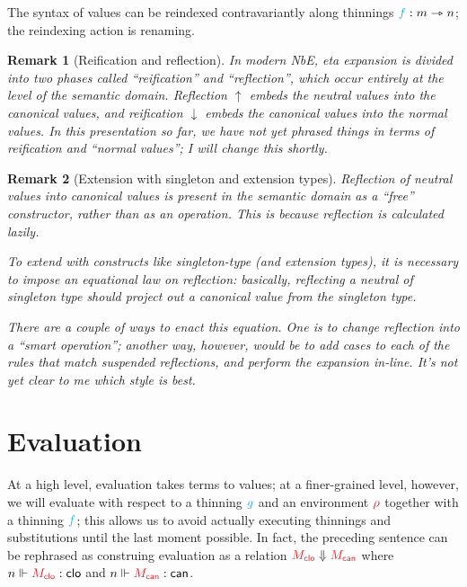 \documentclass{article}
\newtheorem{remark}{Remark}
\newcommand\FmtThin[1]{{\color{ProcessBlue}#1}}
\newcommand\Thin[2]{{#1}\rightarrowtriangle{#2}}
\newcommand\IsThin[3]{\FmtThin{#1}:\Thin{#2}{#3}}
\newcommand\FmtVal[1]{{\color{Red}{#1}}}
\newcommand\EvalClo[2]{\FmtVal{#1}\Downarrow\FmtVal{#2}}
\begin{document}
The syntax of values can be reindexed contravariantly along
thinnings $\IsThin{f}{m}{n}$; the
reindexing action is renaming.

\begin{remark}[Reification and reflection]

  In modern NbE, eta expansion is divided into two phases called
  ``reification'' and ``reflection'', which occur entirely at the level of the
  semantic domain. Reflection $\uparrow$ embeds the neutral values into the
  canonical values, and reification $\downarrow$ embeds the canonical values
  into the normal values.
%
  In this presentation so far, we have not yet phrased things in terms of
  reification and ``normal values''; I will change this shortly.

\end{remark}


\begin{remark}[Extension with singleton and extension types]

  Reflection of neutral values into canonical values is present in the semantic
  domain as a ``free'' constructor, rather than as an operation. This is
  because reflection is calculated lazily.

  To extend with constructs like singleton-type (and extension types), it is
  necessary to impose an equational law on reflection: basically, reflecting a
  neutral of singleton type should project out a canonical value from the
  singleton type.

  There are a couple of ways to enact this equation. One is to change
  reflection into a ``smart operation''; another way, however, would be to add
  cases to each of the rules that match suspended reflections, and perform the
  expansion in-line. It's not yet clear to me which style is best.

\end{remark}


\section{Evaluation}


At a high level, evaluation takes terms to values; at a finer-grained
level, however, we will evaluate with respect to a thinning
$\FmtThin{g}$ and an environment $\FmtVal{\rho}$ together with a
thinning $\FmtThin{f}$; this allows us to avoid actually executing
thinnings and substitutions until the last moment possible. In fact,
the preceding sentence can be rephrased as construing evaluation as a
relation $\EvalClo{M_\SortClo}{M_\SortCan}$ where
$\IsVal{n}{M_\SortClo}{\SortClo}$ and
$\IsVal{n}{M_\SortCan}{\SortCan}$.
\end{document}
